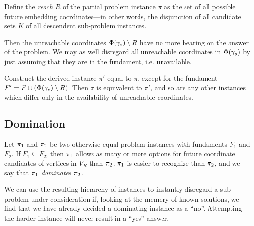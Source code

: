 Define the \emph{reach} $R$ of the partial problem instance $\pi$ as the set of all possible future embedding coordinates---in other words, the disjunction of all candidate sets $K$ of all descendent sub-problem instances.

Then the unreachable coordinates $\Phi(\gamma_s) \setminus R$ have no more bearing on the answer of the problem. We may as well disregard all unreachable coordinates in $\Phi(\gamma_s)$ by just assuming that they are in the fundament, i.e. unavailable.

Construct the derived instance $\pi'$ equal to $\pi$, except for the fundament $F' = F \cup (\Phi(\gamma_s) \setminus R)$. Then $\pi$ is equivalent to $\pi'$, and so are any other instances which differ only in the availability of unreachable coordinates.

\subsection{Domination}

Let $\pi_1$ and $\pi_2$ be two otherwise equal problem instances with fundaments $F_1$ and $F_2$. If $F_1 \subseteq F_2$, then $\pi_1$ allows as many or more options for future coordinate candidates of vertices in $V_R$ than $\pi_2$. $\pi_1$ is easier to recognize than $\pi_2$, and we say that $\pi_1$ \emph{dominates} $\pi_2$.

We can use the resulting hierarchy of instances to instantly disregard a sub-problem under consideration if, looking at the memory of known solutions, we find that we have already decided a dominating instance as a ``no''. Attempting the harder instance will never result in a ``yes''-answer.

